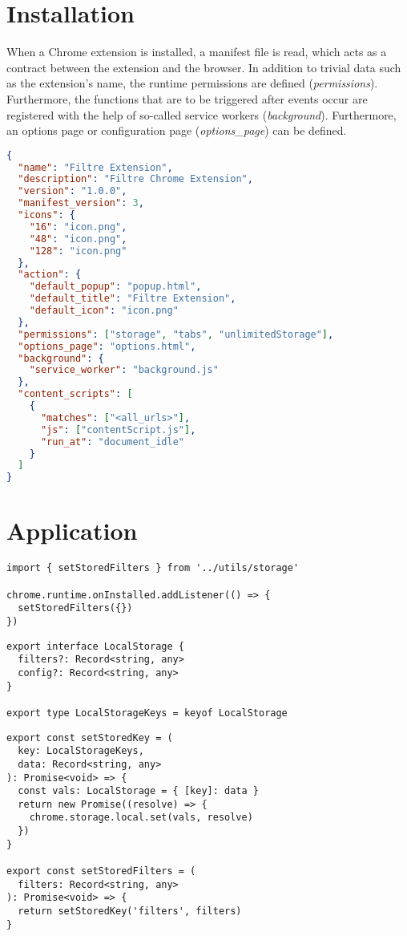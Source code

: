 \section{Installation}
When a Chrome extension is installed, a manifest file is read, which acts as a contract between the extension and the browser. In addition to trivial data such as the extension's name, the runtime permissions are defined (\textit{permissions}). Furthermore, the functions that are to be triggered after events occur are registered with the help of so-called service workers (\textit{background}). Furthermore, an options page or configuration page (\textit{options\_page}) can be defined.
\begin{lstlisting}[caption={manifest.json}, language=json]
{
  "name": "Filtre Extension",
  "description": "Filtre Chrome Extension",
  "version": "1.0.0",
  "manifest_version": 3,
  "icons": {
    "16": "icon.png",
    "48": "icon.png",
    "128": "icon.png"
  },
  "action": {
    "default_popup": "popup.html",
    "default_title": "Filtre Extension",
    "default_icon": "icon.png"
  },
  "permissions": ["storage", "tabs", "unlimitedStorage"],
  "options_page": "options.html",
  "background": {
    "service_worker": "background.js"
  },
  "content_scripts": [
    {
      "matches": ["<all_urls>"],
      "js": ["contentScript.js"],
      "run_at": "document_idle"
    }
  ]
}
\end{lstlisting}

\section{Application}
\begin{lstlisting}[style=ES6, caption={background/index.ts}]
import { setStoredFilters } from '../utils/storage'

chrome.runtime.onInstalled.addListener(() => {
  setStoredFilters({})
})
\end{lstlisting}

\begin{lstlisting}[style=ES6, caption={TypeScript interface of a LocalStorage object in utils/storage.ts}]
export interface LocalStorage {
  filters?: Record<string, any>
  config?: Record<string, any>
}

export type LocalStorageKeys = keyof LocalStorage
\end{lstlisting}

\begin{lstlisting}[style=ES6, caption={utils/storage.ts}]
export const setStoredKey = (
  key: LocalStorageKeys,
  data: Record<string, any>
): Promise<void> => {
  const vals: LocalStorage = { [key]: data }
  return new Promise((resolve) => {
    chrome.storage.local.set(vals, resolve)
  })
}

export const setStoredFilters = (
  filters: Record<string, any>
): Promise<void> => {
  return setStoredKey('filters', filters)
}
\end{lstlisting}
